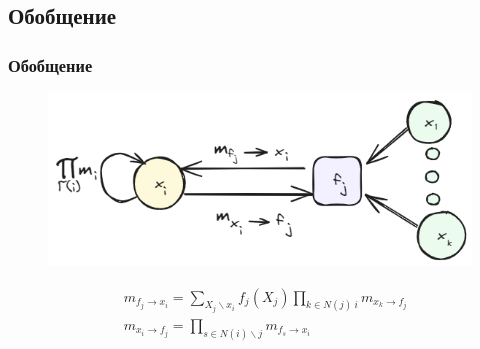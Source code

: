 \subsection{Обобщение}

\begin{frame}
    \frametitle{Обобщение}
    \begin{figure}
        \includegraphics[width=0.8\linewidth]{assets/message_passing.excalidraw.png}
    \end{figure}
    $$
        \begin{aligned}
            &m_{f_j \rightarrow x_i} = \sum_{X_j \backslash x_i} f_j(X_j) \prod_{k\in N(j) \ i} m_{x_k \rightarrow f_j}\\
            &m_{x_i \rightarrow f_j} = \prod_{s \in N(i) \backslash j} m_{f_s \rightarrow x_i}
        \end{aligned}
    $$
\end{frame}









